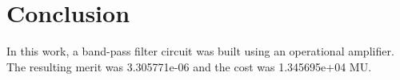 \section{Conclusion}
\label{sec:conclusion}
\vspace{3mm}

\par In this work, a band-pass filter circuit was built using an operational amplifier. The resulting merit was 3.305771e-06 and the cost was 1.345695e+04 MU. 
